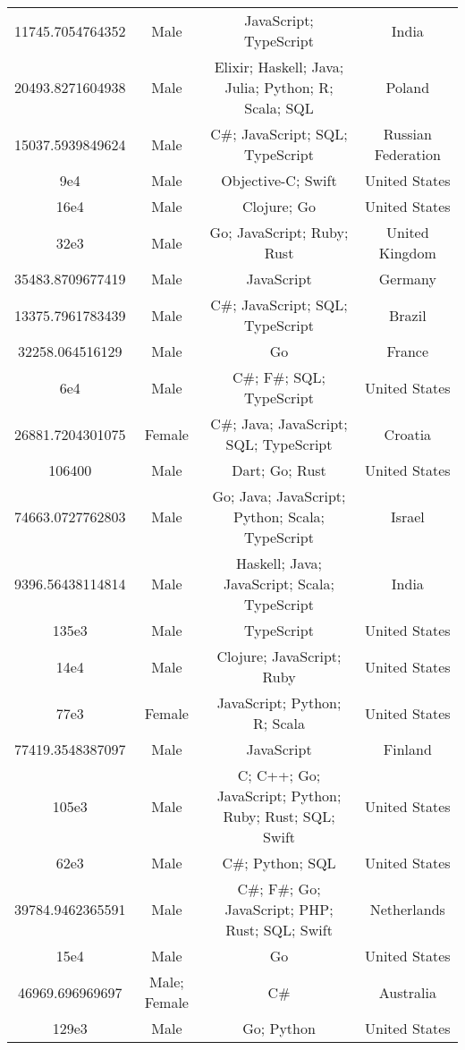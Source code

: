 \begin{center}
\begin{tabular}{ |c|c|c|c| }
11745.7054764352  &  Male  &  JavaScript; TypeScript  &  India  \\ 
20493.8271604938  &  Male  &  Elixir; Haskell; Java; Julia; Python; R; Scala; SQL  &  Poland  \\ 
15037.5939849624  &  Male  &  C\#; JavaScript; SQL; TypeScript  &  Russian Federation  \\ 
9e4  &  Male  &  Objective-C; Swift  &  United States  \\ 
16e4  &  Male  &  Clojure; Go  &  United States  \\ 
32e3  &  Male  &  Go; JavaScript; Ruby; Rust  &  United Kingdom  \\ 
35483.8709677419  &  Male  &  JavaScript  &  Germany  \\ 
13375.7961783439  &  Male  &  C\#; JavaScript; SQL; TypeScript  &  Brazil  \\ 
32258.064516129  &  Male  &  Go  &  France  \\ 
6e4  &  Male  &  C\#; F\#; SQL; TypeScript  &  United States  \\ 
26881.7204301075  &  Female  &  C\#; Java; JavaScript; SQL; TypeScript  &  Croatia  \\ 
106400  &  Male  &  Dart; Go; Rust  &  United States  \\ 
74663.0727762803  &  Male  &  Go; Java; JavaScript; Python; Scala; TypeScript  &  Israel  \\ 
9396.56438114814  &  Male  &  Haskell; Java; JavaScript; Scala; TypeScript  &  India  \\ 
135e3  &  Male  &  TypeScript  &  United States  \\ 
14e4  &  Male  &  Clojure; JavaScript; Ruby  &  United States  \\ 
77e3  &  Female  &  JavaScript; Python; R; Scala  &  United States  \\ 
77419.3548387097  &  Male  &  JavaScript  &  Finland  \\ 
105e3  &  Male  &  C; C++; Go; JavaScript; Python; Ruby; Rust; SQL; Swift  &  United States  \\ 
62e3  &  Male  &  C\#; Python; SQL  &  United States  \\ 
39784.9462365591  &  Male  &  C\#; F\#; Go; JavaScript; PHP; Rust; SQL; Swift  &  Netherlands  \\ 
15e4  &  Male  &  Go  &  United States  \\ 
46969.696969697  &  Male; Female  &  C\#  &  Australia  \\ 
129e3  &  Male  &  Go; Python  &  United States  \\ 

\end{tabular}
\end{center}
